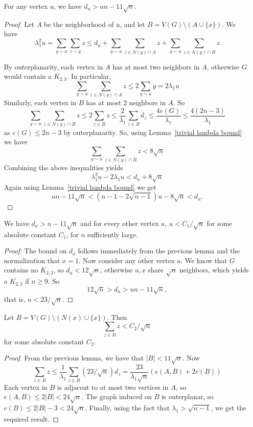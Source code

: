 \begin{lemma}
 For any vertex $u$, we have $d_u > un - 11\sqrt{n}$.
\end{lemma}
\begin{proof}
 Let $A$ be the neighborhood of $u$, and let $B = V(G) \setminus (A\cup \{x\})$.  We have 
  \[ \lambda_1^2 u = \sum_{y \sim u} \sum_{z \sim y} z \leq d_u + \sum_{y \sim u} \sum_{z \in N(y)\cap A} z + \sum_{y \sim u} \sum_{z \in N(y)\cap B} z \]

\noindent By outerplanarity, each vertex in $A$ has at most two neighbors in $A$, otherwise
$G$ would contain a $K_{2,3}$.  In particular,
 \[ \sum_{y \sim u} \sum_{z \in N(y)\cap A} z  \leq 2 \sum_{y \sim u} y = 2\lambda_1 u \]
Similarly, each vertex in $B$ has at most $2$ neighbors in $A$.  So
 \[ \sum_{y \sim u} \sum_{z \in N(y)\cap B} z \leq 2 \sum_{z \in B} z \leq \frac{2}{\lambda_1} \sum_{z \in B} d_z \leq \frac{4e(G)}{\lambda_1} \leq \frac{4(2n-3)}{\lambda_1}\]
as  $e(G) \leq 2n-3$ by outerplanarity.  So, using Lemma~\ref{trivial lambda bound} we have
 \[ \sum_{y \sim u} \sum_{z \in N(y)\cap B} z < 8 \sqrt{n}\]
Combining the above inequalities yields
 \[ \lambda_1^2 u - 2\lambda_1 u < d_u + 8 \sqrt{n}\]
Again using Lemma~\ref{trivial lambda bound} we get
 \[ un - 11\sqrt{n} <  (n-1 - 2\sqrt{n-1}) u - 8 \sqrt{n} < d_u .\]
\end{proof}

\begin{lemma}\label{small eigvec}
 We have $d_x > n - 11 \sqrt{n}$ and for every other vertex $u$, $u < C_1 / \sqrt{n}$ for some absolute constant $C_1$, for $n$ sufficiently large.
\end{lemma}
\begin{proof}
The bound on $d_x$ follows immediately from the previous lemma and the normalization that
$x=1$.  Now consider any other vertex $u$.  We know that $G$ contains no $K_{2,3}$, so $d_u < 12 \sqrt{n}$, otherwise $u,x$ share $\sqrt{n}$ neighbors, which
yields a $K_{2,3}$ if $n \geq 9$.  So
 \[ 12 \sqrt{n} > d_u > u n - 11\sqrt{n}, \]
that is, $u < 23 / \sqrt{n}$.
\end{proof}

\begin{lemma}\label{bound bad elements}
 Let $B = V(G) \setminus (N(x) \cup \{x\})$.  Then
  \[ \sum_{z \in B} z < C_2 / \sqrt{n} \]
 for some absolute constant $C_2$.
\end{lemma}
\begin{proof}
From the previous lemma, we have that $|B| < 11 \sqrt{n}$.  Now
 \[ \sum_{z \in B} z \leq \frac{1}{\lambda_1} \sum_{z \in B} \left(23 / \sqrt{n}\right) d_z = \frac{23}{\lambda_1 \sqrt{n}} \left( e(A,B) + 2 e(B)\right) \]
Each vertex in $B$ is adjacent to at most two vertices in $A$, so $e(A,B) \leq 2 |B| < 24 \sqrt{n}$.  The graph induced on $B$ is outerplanar, so
$e(B) \leq 2|B| - 3 < 24 \sqrt{n}$.  Finally, using the fact that $\lambda_1 > \sqrt{n-1}$, we get the required result.
\end{proof}

